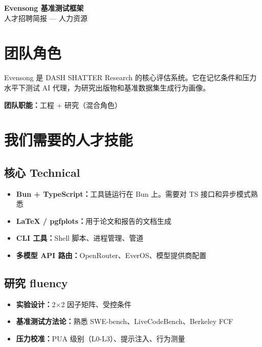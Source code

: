 \documentclass[11pt,a4paper]{article}
\begin{document}
\begin{center}
{\fontsize{22pt}{28pt}\selectfont\sffamily\bfseries\color{deep}Evensong 基准测试框架}\\
{\fontsize{11pt}{14pt}\selectfont\sffamily\color{gray}人才招聘简报 — 人力资源}
\end{center}
\vspace{2mm}{\color{deep}\rule{\textwidth}{0.5pt}}\vspace{2mm}

\section{团队角色}

Evensong 是 DASH SHATTER Research 的核心评估系统。它在记忆条件和压力水平下测试 AI 代理，为研究出版物和基准数据集生成行为画像。

\textbf{团队职能：}工程 + 研究（混合角色）

\section{我们需要的人才技能}

\subsection*{核心 Technical}
\begin{itemize}
  \item \textbf{Bun + TypeScript：}工具链运行在 Bun 上。需要对 TS 接口和异步模式熟悉
  \item \textbf{LaTeX / pgfplots：}用于论文和报告的文档生成
  \item \textbf{CLI 工具：}Shell 脚本、进程管理、管道
  \item \textbf{多模型 API 路由：}OpenRouter、EverOS、模型提供商配置
\end{itemize}

\subsection*{研究 fluency}
\begin{itemize}
  \item \textbf{实验设计：}2$\times$2 因子矩阵、受控条件
  \item \textbf{基准测试方法论：}熟悉 SWE-bench、LiveCodeBench、Berkeley FCF
  \item \textbf{压力校准：}PUA 级别（L0-L3）、提示注入、行为测量
\end{itemize}
\end{document}
